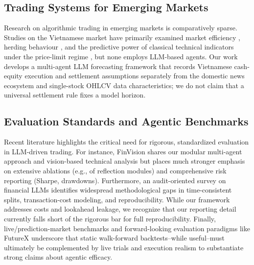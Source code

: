 \subsection{Trading Systems for Emerging Markets}

Research on algorithmic trading in emerging markets is comparatively sparse. Studies on the Vietnamese market have primarily examined market efficiency \cite{vo2019efficiency}, herding behaviour \cite{pham2021herding}, and the predictive power of classical technical indicators under the price-limit regime \cite{truong2020technical}, but none employs LLM-based agents. Our work develops a multi-agent LLM forecasting framework that records Vietnamese cash-equity execution and settlement assumptions separately from the domestic news ecosystem and single-stock OHLCV data characteristics; we do not claim that a universal settlement rule fixes a model horizon.

\subsection{Evaluation Standards and Agentic Benchmarks}

Recent literature highlights the critical need for rigorous, standardized evaluation in LLM-driven trading. For instance, FinVision \cite{fatemi2024finvision} shares our modular multi-agent approach and vision-based technical analysis but places much stronger emphasis on extensive ablations (e.g., of reflection modules) and comprehensive risk reporting (Sharpe, drawdowns). Furthermore, an audit-oriented survey on financial LLMs \cite{xia2026agentictrading} identifies widespread methodological gaps in time-consistent splits, transaction-cost modeling, and reproducibility. While our framework addresses costs and lookahead leakage, we recognize that our reporting detail currently falls short of the rigorous bar for full reproducibility. Finally, live/prediction-market benchmarks \cite{zhang2026predictionarena, arora2026predictionmarketbench} and forward-looking evaluation paradigms like FutureX \cite{zeng2025futurexadvancedlivebenchmark} underscore that static walk-forward backtests--while useful--must ultimately be complemented by live trials and execution realism to substantiate strong claims about agentic efficacy.
